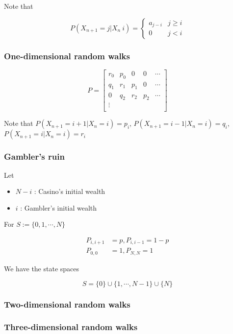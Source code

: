 \documentclass[12pt]{article}
\theoremstyle{nonumberbreak}
\begin{document}
Note that

$$
P(X_{n+1} = j | X_n \ i) = \begin{cases} a_{j-i} & j \ge i \\ 0 & j < i \end{cases}
$$


\subsubsection*{One-dimensional random walks}

$$
P = \begin{bmatrix}
r_0 & p_0 & 0 & 0 & \cdots \\
q_1 & r_1 & p_1 & 0 & \cdots \\
0 & q_2 & r_2 & p_2 & \cdots \\
\vdots & & & & \\
\end{bmatrix}
$$

Note that $P(X_{n+1} = i+1 | X_n = i) = p_i$, $P(X_{n+1} = i-1 | X_n = i) = q_i$, $P(X_{n+1} = i | X_n = i) = r_i$


\subsubsection*{Gambler's ruin}

Let 

\begin{itemize}
	\item $N - i$ : Casino's initial wealth
	\item $i$ : Gambler's initial wealth
\end{itemize}

For $S := \{ 0,1,\cdots, N \}$

$$
\begin{aligned}
P_{i,i+1} &= p, P_{i,i-1} = 1-p \\[8pt]
P_{0,0} &= 1, P_{N,N} = 1
\end{aligned}
$$

We have the state spaces 

$$S = \{ 0\} \cup \{ 1, \cdots, N-1\} \cup \{ N\}$$

\subsubsection*{Two-dimensional random walks}

\subsubsection*{Three-dimensional random walks}
\end{document}
